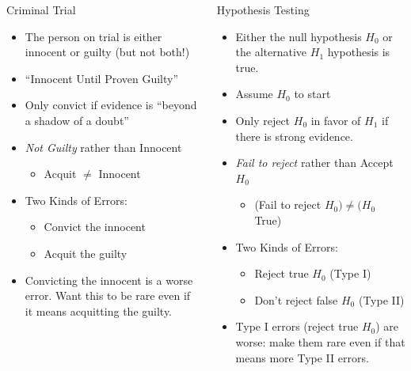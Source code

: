 \documentclass[handout]{beamer}
\begin{document}
\begin{frame}
\footnotesize
\begin{columns}
\begin{column}{6cm} 
   	\begin{block}{Criminal Trial}
	\begin{itemize}
		\item<1-> The person on trial is either innocent or guilty (but not both!)
		\item<2-> ``Innocent Until Proven Guilty''
		\item<3-> Only convict if evidence is ``beyond a shadow of a doubt''
		\item<4-> \emph{Not Guilty} rather than Innocent
			\begin{itemize}\footnotesize
				\item<5-> Acquit $\neq$ Innocent
			\end{itemize}
		\item<6-> Two Kinds of Errors:
			\begin{itemize} \footnotesize
				\item<6-> Convict the innocent
				\item<6->  Acquit the guilty
			\end{itemize}
		\item<7-> Convicting the innocent is a worse error. Want this to be rare even if it means acquitting the guilty.	\end{itemize}
\end{block}
   
   
\end{column} 
\begin{column}{6cm} 


\begin{block}{Hypothesis Testing}
		\begin{itemize}
		\item<1-> Either the null hypothesis $H_0$ or the alternative $H_1$  hypothesis is true.
		\item<2-> Assume $H_0$ to start
		\item<3-> Only reject $H_0$ in favor of $H_1$ if there is strong evidence.
		\item<4-> \emph{Fail to reject} rather than Accept $H_0$	
		\begin{itemize} \footnotesize
			\item<5-> (Fail to reject $H_0) \neq (H_0$ True) 
		\end{itemize}
				\item<6-> Two Kinds of Errors:
			\begin{itemize} \footnotesize
				\item<6-> Reject true $H_0$ (Type I)
				\item<6-> Don't reject false $H_0$ (Type II)
			\end{itemize}
			\item<7-> Type I errors (reject true $H_0$) are worse: make them rare even if that means more Type II errors.
	\end{itemize}
\end{block}


\end{column}
\end{columns}
\end{frame}
\end{document}
